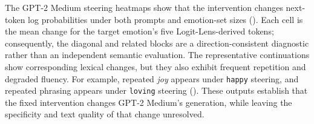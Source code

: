 The GPT-2 Medium steering heatmaps show that the intervention changes next-token log probabilities under both prompts 
and emotion-set sizes (). Each cell is the mean change for the target emotion's five Logit-Lens-derived 
tokens; consequently, the diagonal and related blocks are a direction-consistent diagnostic rather than an independent semantic 
evaluation. The representative continuations show corresponding lexical changes, but they also exhibit frequent repetition and 
degraded fluency. For example, repeated \emph{joy} appears under \texttt{happy} steering, and repeated phrasing appears under \texttt{loving} 
steering (). These outputs establish that the fixed intervention changes GPT-2 Medium's 
generation, while leaving the specificity and text quality of that change unresolved.

